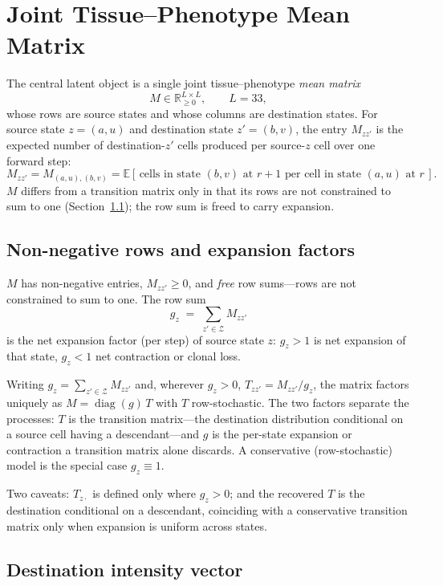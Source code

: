 \documentclass[11pt]{article}
\newcommand{\Reals}{\mathbb{R}}
\newcommand{\Zsp}{\mathcal{Z}}                    %
\newcommand{\E}{\mathbb{E}}
\theoremstyle{definition}
\begin{document}
\section{Joint Tissue--Phenotype Mean Matrix}

The central latent object is a single joint tissue--phenotype \emph{mean
matrix}
\[
  M \in \Reals_{\geq 0}^{L\times L},
  \qquad L = 33,
\]
whose rows are source states and whose columns are destination states. For
source state $z = (a,u)$ and destination state $z' = (b,v)$, the entry $M_{zz'}$
is the expected number of destination-$z'$ cells produced per source-$z$ cell
over one forward step:
\[
  M_{zz'} = M_{(a,u),(b,v)}
  =
  \E[\,\text{cells in state } (b,v) \text{ at } r+1
        \text{ per cell in state } (a,u) \text{ at } r\,] .
\]
$M$ differs from a transition matrix only in that its rows are not constrained
to sum to one (Section~\ref{sec:expansion-factors}); the row sum is freed to carry
expansion.

\subsection{Non-negative rows and expansion factors}
\label{sec:expansion-factors}

$M$ has non-negative entries, $M_{zz'} \geq 0$, and \emph{free} row sums---rows
are not constrained to sum to one. The row sum
\[
  g_z \;=\; \sum_{z'\in\Zsp} M_{zz'}
\]
is the net expansion factor (per step) of source state $z$: $g_z > 1$ is net
expansion of that state, $g_z < 1$ net contraction or clonal loss.

Writing $g_z = \sum_{z'\in\Zsp} M_{zz'}$ and, wherever $g_z > 0$,
$T_{zz'} = M_{zz'}/g_z$, the matrix factors uniquely as
$M = \operatorname{diag}(g)\,T$ with $T$ row-stochastic. The two factors separate
the processes: $T$ is the transition matrix---the destination distribution
conditional on a source cell having a descendant---and $g$ is the per-state
expansion or contraction a transition matrix alone discards. A conservative
(row-stochastic) model is the special case $g_z \equiv 1$.

Two caveats: $T_{z\cdot}$ is defined only where $g_z > 0$; and the recovered $T$
is the destination conditional on a descendant, coinciding with a conservative
transition matrix only when expansion is uniform across states.

\subsection{Destination intensity vector}
\end{document}
